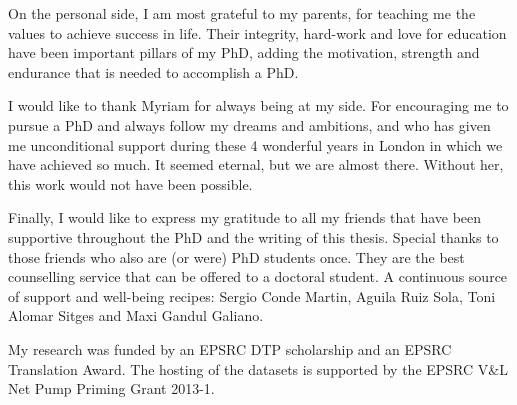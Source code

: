 On the personal side, I am most grateful to my parents, for teaching me the values to achieve success in life. Their integrity, hard-work and love for education have been important pillars of my PhD, adding the motivation, strength and endurance that is needed to accomplish a PhD.

I would like to thank Myriam for always being at my side. For encouraging me to pursue a PhD and always follow my dreams and ambitions, and who has given me unconditional support during these 4 wonderful years in London in which we have achieved so much. It seemed eternal, but we are almost there. Without her, this work would not have been possible.

Finally, I would like to express my gratitude to all my friends that have been supportive throughout the PhD and the writing of this thesis. Special thanks to those friends who also are (or were) PhD students once. They are the best counselling service that can be offered to a doctoral student. A continuous source of support and well-being recipes: Sergio Conde Martin, Aguila Ruiz Sola, Toni Alomar Sitges and Maxi Gandul Galiano.

My research was funded by an EPSRC DTP scholarship and an EPSRC Translation Award. The hosting of the datasets is supported by the EPSRC V\&L Net Pump Priming Grant 2013-1. 

\endgroup



